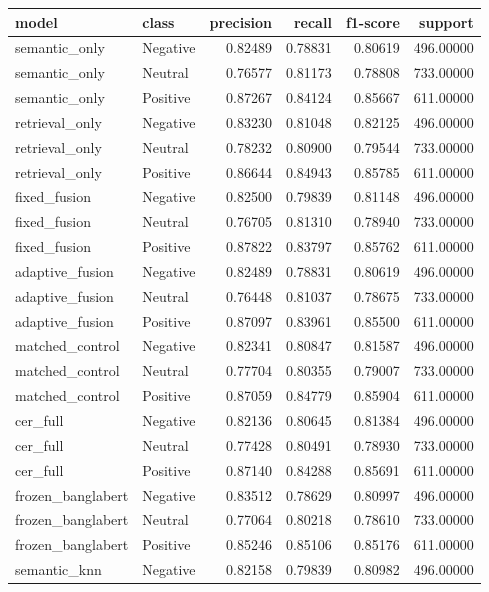 \begin{tabular}{llrrrr}
\toprule
model & class & precision & recall & f1-score & support \\
\midrule
semantic_only & Negative & 0.82489 & 0.78831 & 0.80619 & 496.00000 \\
semantic_only & Neutral & 0.76577 & 0.81173 & 0.78808 & 733.00000 \\
semantic_only & Positive & 0.87267 & 0.84124 & 0.85667 & 611.00000 \\
retrieval_only & Negative & 0.83230 & 0.81048 & 0.82125 & 496.00000 \\
retrieval_only & Neutral & 0.78232 & 0.80900 & 0.79544 & 733.00000 \\
retrieval_only & Positive & 0.86644 & 0.84943 & 0.85785 & 611.00000 \\
fixed_fusion & Negative & 0.82500 & 0.79839 & 0.81148 & 496.00000 \\
fixed_fusion & Neutral & 0.76705 & 0.81310 & 0.78940 & 733.00000 \\
fixed_fusion & Positive & 0.87822 & 0.83797 & 0.85762 & 611.00000 \\
adaptive_fusion & Negative & 0.82489 & 0.78831 & 0.80619 & 496.00000 \\
adaptive_fusion & Neutral & 0.76448 & 0.81037 & 0.78675 & 733.00000 \\
adaptive_fusion & Positive & 0.87097 & 0.83961 & 0.85500 & 611.00000 \\
matched_control & Negative & 0.82341 & 0.80847 & 0.81587 & 496.00000 \\
matched_control & Neutral & 0.77704 & 0.80355 & 0.79007 & 733.00000 \\
matched_control & Positive & 0.87059 & 0.84779 & 0.85904 & 611.00000 \\
cer_full & Negative & 0.82136 & 0.80645 & 0.81384 & 496.00000 \\
cer_full & Neutral & 0.77428 & 0.80491 & 0.78930 & 733.00000 \\
cer_full & Positive & 0.87140 & 0.84288 & 0.85691 & 611.00000 \\
frozen_banglabert & Negative & 0.83512 & 0.78629 & 0.80997 & 496.00000 \\
frozen_banglabert & Neutral & 0.77064 & 0.80218 & 0.78610 & 733.00000 \\
frozen_banglabert & Positive & 0.85246 & 0.85106 & 0.85176 & 611.00000 \\
semantic_knn & Negative & 0.82158 & 0.79839 & 0.80982 & 496.00000 \\

\end{tabular}
